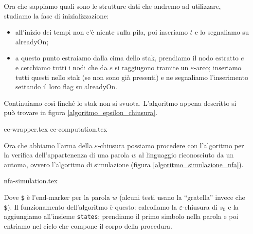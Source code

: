 \documentclass[class=book, crop=false, oneside, 12pt]{standalone}
\begin{document}
Ora che sappiamo quali sono le strutture dati che andremo ad utilizzare, studiamo la fase di inizializzazione: 

\begin{itemize}
    \item all’inizio dei tempi non c’è niente sulla pila, poi inseriamo \(t\) e lo segnaliamo su alreadyOn;
    \item a questo punto estraiamo dalla cima dello stak, prendiamo il nodo estratto \(e\) e cerchiamo tutti i nodi che da \(e\) si raggiugono tramite un \(\varepsilon\)-arco; inseriamo tutti questi nello stak (se non sono già presenti) e ne segnaliamo l'inserimento settando il loro flag su alreadyOn.
\end{itemize}

Continuiamo così finché lo stak non si svuota. L'algoritmo appena descritto si può trovare in figura \ref{algoritmo_epsilon_chiusura}.


	{ec-wrapper.tex}
	{ec-computation.tex}\label{algoritmo_epsilon_chiusura}

Ora che abbiamo l'arma della \(\varepsilon\)-chiusura possiamo procedere con l'algoritmo per la verifica dell'appartenenza di una parola \(w\) al linguaggio riconosciuto da un automa, ovvero l'algoritmo di simulazione (figura \ref{algoritmo_simulazione_nfa}).

{nfa-simulation.tex}\label{algoritmo_simulazione_nfa}

Dove \texttt{\$} è l’end-marker per la parola \(w\) (alcuni testi usano la “gratella” invece che \texttt{\$}).
Il funzionamento dell'algoritmo è questo: calcoliamo la \(\varepsilon\)-chiusura di \(s_0\) e la aggiungiamo all'insieme \texttt{states}; prendiamo il primo simbolo nella parola e poi entriamo nel ciclo che compone il corpo della procedura.
\end{document}
